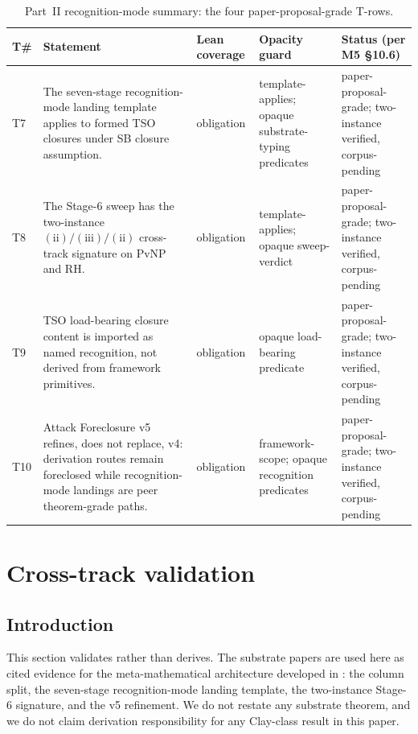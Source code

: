 \documentclass[11pt]{article}
\newcommand{\SevenStage}{seven-stage recognition-mode landing template}
\newcommand{\SigPattern}{$\mathrm{(ii)}/\mathrm{(iii)}/\mathrm{(ii)}$}
\newcommand{\PPGrade}{paper-proposal-grade}
\newcommand{\TwoInstance}{two-instance verified, corpus-pending}
\theoremstyle{definition}
\begin{document}
\begin{table}[H]
  \centering
  \caption{Part~II recognition-mode summary: the four paper-proposal-grade T-rows.}
  \label{tab:recognition:summary}
  \scriptsize
  \renewcommand{\arraystretch}{1.08}
  \begin{tabularx}{\textwidth}{@{}>{\raggedright\arraybackslash}p{}>{\raggedright\arraybackslash}X>{\raggedright\arraybackslash}p{}>{\raggedright\arraybackslash}p{}>{\raggedright\arraybackslash}p{}@{}}
    \toprule
    T\# & Statement & Lean coverage & Opacity guard & Status (per M5 \S10.6) \\
    \midrule
    T7 & The seven-stage recognition-mode landing template applies to formed TSO closures under SB closure assumption. & obligation & template-applies; opaque substrate-typing predicates & \PPGrade; \TwoInstance \\
    T8 & The Stage-6 sweep has the two-instance \SigPattern{} cross-track signature on PvNP and RH. & obligation & template-applies; opaque sweep-verdict & \PPGrade; \TwoInstance \\
    T9 & TSO load-bearing closure content is imported as named recognition, not derived from framework primitives. & obligation & opaque load-bearing predicate & \PPGrade; \TwoInstance \\
    T10 & Attack Foreclosure v5 refines, does not replace, v4: derivation routes remain foreclosed while recognition-mode landings are peer theorem-grade paths. & obligation & framework-scope; opaque recognition predicates & \PPGrade; \TwoInstance \\
    \bottomrule
  \end{tabularx}
\end{table}
  \section{Cross-track validation}\label{sec:validation}

\subsection{Introduction}\label{sec:validation:intro}

This section validates rather than derives.  The substrate papers are
used here as cited evidence for the meta-mathematical architecture
developed in : the column split, the
\SevenStage, the two-instance Stage-6 signature, and the v5 refinement.
We do not restate any substrate theorem, and we do not claim derivation
responsibility for any Clay-class result in this paper.
\end{document}
